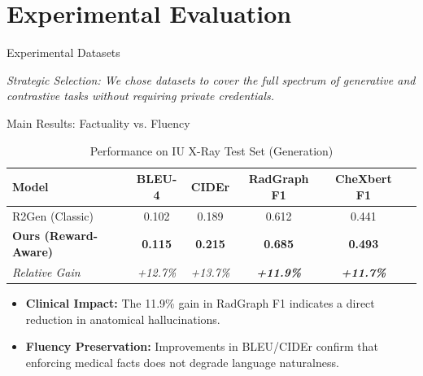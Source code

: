 \documentclass[aspectratio=169]{beamer}
\begin{document}
\section{Experimental Evaluation}

\begin{frame}{Experimental Datasets}
  \begin{table}
    \centering
  \end{table}
  \vspace{0.3cm}
  \textit{Strategic Selection: We chose datasets to cover the full spectrum of generative and contrastive tasks without requiring private credentials.}
\end{frame}

\begin{frame}{Main Results: Factuality vs. Fluency}
  \small
  \begin{table}
    \centering
    \caption{Performance on IU X-Ray Test Set (Generation)}
    \begin{tabular}{lccccc}
      \toprule
      \textbf{Model} & \textbf{BLEU-4} & \textbf{CIDEr} & \textbf{RadGraph F1} & \textbf{CheXbert F1} \\
      \midrule
      R2Gen (Classic) & 0.102 & 0.189 & 0.612 & 0.441 \\
      \textbf{Ours (Reward-Aware)} & \textbf{0.115} & \textbf{0.215} & \textbf{0.685} & \textbf{0.493} \\
      \textit{Relative Gain} & \textit{+12.7\%} & \textit{+13.7\%} & \textbf{\textit{+11.9\%}} & \textbf{\textit{+11.7\%}} \\
      \bottomrule
    \end{tabular}
  \end{table}
  \begin{itemize}
    \item \textbf{Clinical Impact:} The 11.9\% gain in RadGraph F1 indicates a direct reduction in anatomical hallucinations.
    \item \textbf{Fluency Preservation:} Improvements in BLEU/CIDEr confirm that enforcing medical facts does not degrade language naturalness.
  \end{itemize}
\end{frame}
\end{document}
